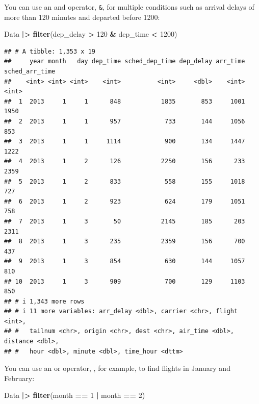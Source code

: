 \documentclass[
]{book}
\newenvironment{Shaded}{\begin{snugshade}}{\end{snugshade}}
\newcommand{\DecValTok}[1]{\textcolor[rgb]{0.00,0.00,0.81}{#1}}
\newcommand{\FunctionTok}[1]{\textcolor[rgb]{0.13,0.29,0.53}{\textbf{#1}}}
\newcommand{\NormalTok}[1]{#1}
\newcommand{\SpecialCharTok}[1]{\textcolor[rgb]{0.81,0.36,0.00}{\textbf{#1}}}
\theoremstyle{definition}
\theoremstyle{definition}
\theoremstyle{definition}
\theoremstyle{definition}
\theoremstyle{remark}
\begin{document}
You can use an and operator, \texttt{\&}, for multiple conditions such as arrival delays of more than 120 minutes and departed before 1200:

\begin{Shaded}
\begin{Highlighting}[]
\NormalTok{Data }\SpecialCharTok{|\textgreater{}} 
  \FunctionTok{filter}\NormalTok{(dep\_delay }\SpecialCharTok{\textgreater{}} \DecValTok{120} \SpecialCharTok{\&}\NormalTok{ dep\_time }\SpecialCharTok{\textless{}} \DecValTok{1200}\NormalTok{)}
\end{Highlighting}
\end{Shaded}

\begin{verbatim}
## # A tibble: 1,353 x 19
##     year month   day dep_time sched_dep_time dep_delay arr_time sched_arr_time
##    <int> <int> <int>    <int>          <int>     <dbl>    <int>          <int>
##  1  2013     1     1      848           1835       853     1001           1950
##  2  2013     1     1      957            733       144     1056            853
##  3  2013     1     1     1114            900       134     1447           1222
##  4  2013     1     2      126           2250       156      233           2359
##  5  2013     1     2      833            558       155     1018            727
##  6  2013     1     2      923            624       179     1051            758
##  7  2013     1     3       50           2145       185      203           2311
##  8  2013     1     3      235           2359       156      700            437
##  9  2013     1     3      854            630       144     1057            810
## 10  2013     1     3      909            700       129     1103            850
## # i 1,343 more rows
## # i 11 more variables: arr_delay <dbl>, carrier <chr>, flight <int>,
## #   tailnum <chr>, origin <chr>, dest <chr>, air_time <dbl>, distance <dbl>,
## #   hour <dbl>, minute <dbl>, time_hour <dttm>
\end{verbatim}

You can use an or operator, \texttt{\textbar{}}, for example, to find flights in January and February:

\begin{Shaded}
\begin{Highlighting}[]
\NormalTok{Data }\SpecialCharTok{|\textgreater{}} 
  \FunctionTok{filter}\NormalTok{(month }\SpecialCharTok{==} \DecValTok{1} \SpecialCharTok{|}\NormalTok{ month }\SpecialCharTok{==} \DecValTok{2}\NormalTok{)}
\end{Highlighting}
\end{Shaded}
\end{document}
